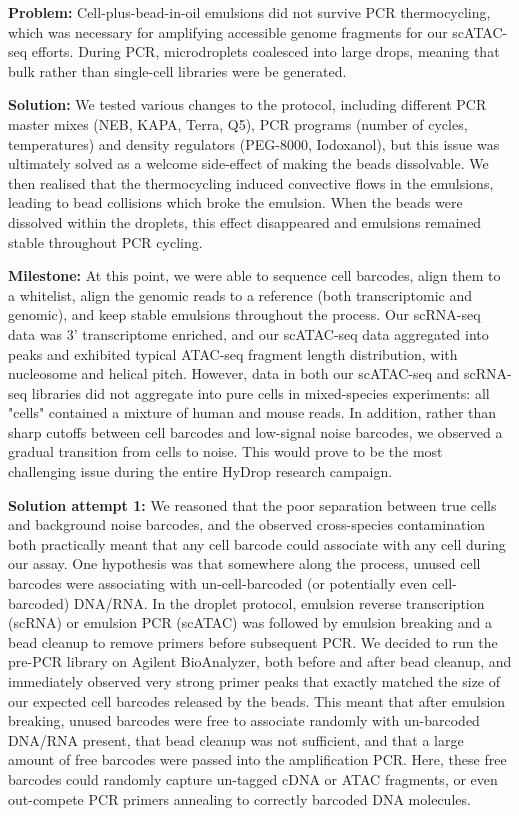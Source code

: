 \textbf{Problem:} Cell-plus-bead-in-oil emulsions did not survive PCR thermocycling, which was necessary for amplifying accessible genome fragments for our scATAC-seq efforts. During PCR, microdroplets coalesced into large drops, meaning that bulk rather than single-cell libraries were be generated.

\textbf{Solution:} We tested various changes to the protocol, including different PCR master mixes (NEB, KAPA, Terra, Q5), PCR programs (number of cycles, temperatures) and density regulators (PEG-8000, Iodoxanol), but this issue was ultimately solved as a welcome side-effect of making the beads dissolvable. We then realised that the thermocycling induced convective flows in the emulsions, leading to bead collisions which broke the emulsion. When the beads were dissolved within the droplets, this effect disappeared and emulsions remained stable throughout PCR cycling.

\textbf{Milestone:} At this point, we were able to sequence cell barcodes, align them to a whitelist, align the genomic reads to a reference (both transcriptomic and genomic), and keep stable emulsions throughout the process. Our scRNA-seq data was 3' transcriptome enriched, and our scATAC-seq data aggregated into peaks and exhibited typical ATAC-seq fragment length distribution, with nucleosome and helical pitch. However, data in both our scATAC-seq and scRNA-seq libraries did not aggregate into pure cells in mixed-species experiments: all "cells" contained a mixture of human and mouse reads. In addition, rather than sharp cutoffs between cell barcodes and low-signal noise barcodes, we observed a gradual transition from cells to noise. This would prove to be the most challenging issue during the entire HyDrop research campaign.

\textbf{Solution attempt 1:} We reasoned that the poor separation between true cells and background noise barcodes, and the observed cross-species contamination both practically meant that any cell barcode could associate with any cell during our assay. One hypothesis was that somewhere along the process, unused cell barcodes were associating with un-cell-barcoded (or potentially even cell-barcoded) DNA/RNA. In the droplet protocol, emulsion reverse transcription (scRNA) or emulsion PCR (scATAC) was followed by emulsion breaking and a bead cleanup to remove primers before subsequent PCR. We decided to run the pre-PCR library on Agilent BioAnalyzer, both before and after bead cleanup, and immediately observed very strong primer peaks that exactly matched the size of our expected cell barcodes released by the beads. This meant that after emulsion breaking, unused barcodes were free to associate randomly with un-barcoded DNA/RNA present, that bead cleanup was not sufficient, and that a large amount of free barcodes were passed into the amplification PCR. Here, these free barcodes could randomly capture un-tagged cDNA or ATAC fragments, or even out-compete PCR primers annealing to correctly barcoded DNA molecules.


